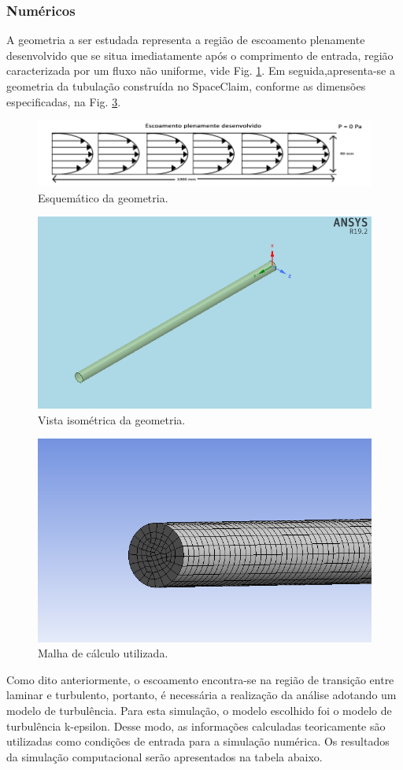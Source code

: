 \documentclass[12pt]{article}
\begin{document}
\subsubsection{Numéricos}

A geometria a ser estudada representa a região de escoamento plenamente desenvolvido que se situa imediatamente após o comprimento de entrada, região caracterizada por um fluxo não uniforme, vide Fig. \ref{fig:schematics}. Em seguida,apresenta-se a geometria da tubulação construída no SpaceClaim, conforme as dimensões especificadas, na Fig. \ref{fig:isometric}.


\begin{figure}[H]
    \centering
    \includegraphics[width=.6\textwidth]{fig/schematics.png}
    \caption{Esquemático da geometria.}
		\label{fig:schematics}
\end{figure}

\begin{figure}[H]
    \centering
    \includegraphics[width=.5\textwidth]{fig/isometric_view.png}
    \caption{Vista isométrica da geometria.}
		\label{fig:isometric}
\end{figure}

\begin{figure}[H]
    \centering
    \includegraphics[width=.5\textwidth]{fig/mesh.png}
    \caption{Malha de cálculo utilizada.}
		\label{fig:isometric}
\end{figure}

Como dito anteriormente, o escoamento encontra-se na região de transição entre laminar e turbulento, portanto, é necessária a realização da análise adotando um modelo de turbulência. Para esta simulação, o modelo escolhido foi o modelo de turbulência k-epsilon. Desse modo, as informações calculadas teoricamente são utilizadas como condições de entrada para a simulação numérica. Os resultados da simulação computacional serão apresentados na tabela abaixo. 
\end{document}

